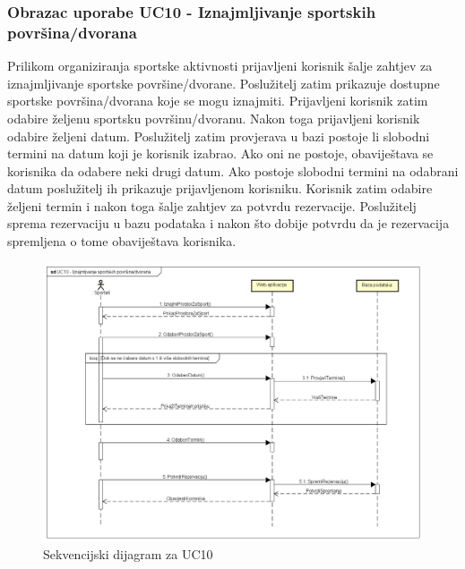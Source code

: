 				\subsubsection{Obrazac uporabe UC10 - Iznajmljivanje sportskih površina/dvorana}
				Prilikom organiziranja sportske aktivnosti prijavljeni korisnik šalje zahtjev za iznajmljivanje sportske površine/dvorane. Poslužitelj zatim prikazuje dostupne sportske površina/dvorana koje se mogu iznajmiti. Prijavljeni korisnik zatim odabire željenu sportsku površinu/dvoranu. Nakon toga prijavljeni korisnik odabire željeni datum. Poslužitelj zatim provjerava u bazi postoje li slobodni termini na datum koji je korisnik izabrao. Ako oni ne postoje, obaviještava se korisnika da odabere neki drugi datum. Ako postoje slobodni termini na odabrani datum poslužitelj ih prikazuje prijavljenom korisniku. Korisnik zatim odabire željeni termin i nakon toga šalje zahtjev za potvrdu rezervacije. Poslužitelj sprema rezervaciju u bazu podataka i nakon što dobije potvrdu da je rezervacija spremljena o tome obaviještava korisnika.
				
				\begin{figure}[H]
					\includegraphics[width=\textwidth]{slike/UC10_SEKV_DIJ.png}
					\caption{Sekvencijski dijagram za UC10}
				\end{figure}
			
